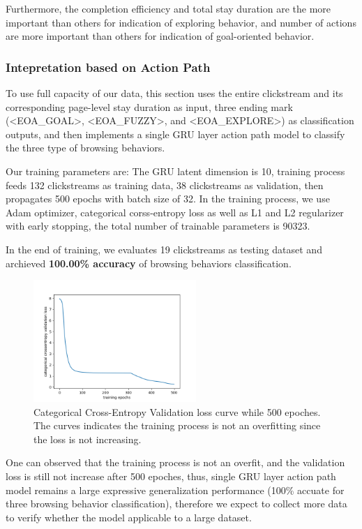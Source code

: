 Furthermore, the completion efficiency and total stay duration are the more important than others for indication of exploring behavior,
and number of actions are more important than others for indication of goal-oriented behavior.

\subsubsection{Intepretation based on Action Path}
\label{sec:inter-action-path}

To use full capacity of our data, this section uses the entire clickstream and its corresponding
page-level stay duration as input, three ending mark (<EOA\_GOAL>, <EOA\_FUZZY>, and <EOA\_EXPLORE>) 
as classification outputs, and then implements a single GRU layer action path model 
to classify the three type of browsing behaviors.

Our training parameters are: 
The GRU latent dimension is 10, training process feeds 132 clickstreams as training data,
38 clickstreams as validation, then 
propagates 500 epochs with batch size of 32. In the training process, we use Adam optimizer,
 categorical corss-entropy loss as well as L1 and L2 regularizer with early stopping,
the total number of trainable parameters is 90323.

In the end of training, we evaluates 19 clickstreams as testing dataset and 
archieved \textbf{100.00\% accuracy} of browsing behaviors classification.

\begin{figure}[H]
    \centering
    \includegraphics[width=0.55\textwidth]{figures/class-loss}
    \caption{Categorical Cross-Entropy Validation loss curve while 500 epoches. 
    The curves indicates the training process is not an overfitting since the loss is not increasing.}
    \label{fig:class-loss}
\end{figure}

One can observed that the training process is not an overfit, and the validation loss is 
still not increase after 500 epoches, thus, single GRU layer action path model 
remains a large expressive generalization performance 
(100\% accuate for three browsing behavior classification), therefore
we expect to collect more data to verify whether the model applicable to a large dataset.

